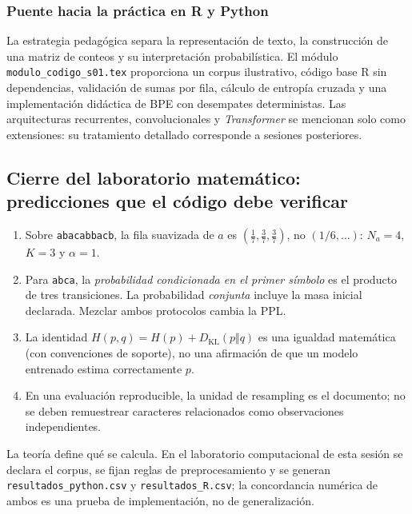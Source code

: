 \subsubsection*{Puente hacia la práctica en R y Python}

La estrategia pedagógica separa la representación de texto, la construcción
de una matriz de conteos y su interpretación probabilística. El módulo
\nolinkurl{modulo_codigo_s01.tex} proporciona un corpus ilustrativo, código base R
sin dependencias, validación de sumas por fila, cálculo de entropía cruzada
y una implementación didáctica de BPE con desempates deterministas.
Las arquitecturas recurrentes, convolucionales y \emph{Transformer} se
mencionan solo como extensiones: su tratamiento detallado corresponde
a sesiones posteriores.


\subsection{Cierre del laboratorio matemático: predicciones que el código debe verificar}
\label{s01:lab:mat:cierre}
\begin{enumerate}
\item Sobre \texttt{abacabbacb}, la fila suavizada de $a$ es
$\left(\frac17,\frac37,\frac37\right)$, no $(1/6,\ldots)$:
$N_a=4$, $K=3$ y $\alpha=1$.
\item Para \texttt{abca}, la \emph{probabilidad condicionada en el primer
símbolo} es el producto de tres transiciones. La probabilidad \emph{conjunta}
incluye la masa inicial declarada. Mezclar ambos protocolos cambia la PPL.
\item La identidad $H(p,q)=H(p)+D_{\mathrm{KL}}(p\Vert q)$ es una igualdad
matemática (con convenciones de soporte), no una afirmación de que un modelo
entrenado estima correctamente $p$.
\item En una evaluación reproducible, la unidad de resampling es el documento;
no se deben remuestrear caracteres relacionados como observaciones independientes.
\end{enumerate}
\begin{puente}
La teoría define qué se calcula. En el laboratorio computacional de esta sesión
se declara el corpus, se fijan reglas de preprocesamiento y se generan
\nolinkurl{resultados_python.csv} y \texttt{resultados\_R.csv}; la concordancia
numérica de ambos es una prueba de implementación, no de generalización.
\end{puente}

